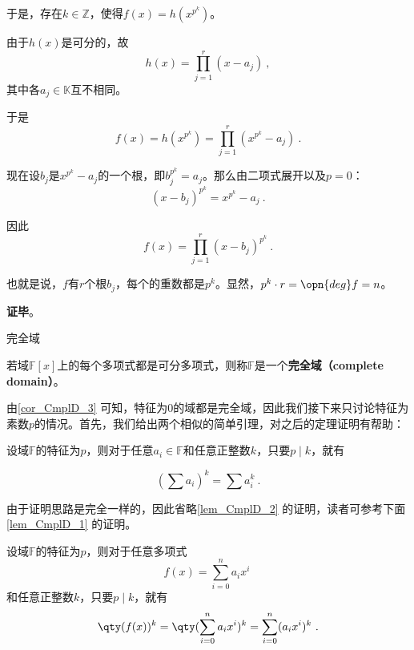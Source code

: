 于是，存在$k\in\mathbb{Z}$，使得$f(x) = h(x^{p^k})$。

由于$h(x)$是可分的，故
\begin{equation}
h(x) = \prod_{j=1}^{r}(x-a_j)~,
\end{equation}
其中各$a_j\in\mathbb{K}$互不相同。

于是
\begin{equation}
f(x) = h(x^{p^k}) = \prod_{j=1}^{r}(x^{p^k}-a_j)~.
\end{equation}

现在设$b_j$是$x^{p^k}-a_j$的一个根，即$b_j^{p^k}=a_j$。那么由二项式展开以及$p=0$：
\begin{equation}
(x-b_j)^{p^k} = x^{p^k}-a_j~.
\end{equation}

因此
\begin{equation}
f(x) = \prod_{j=1}^{r} (x-b_j)^{p^k}~.
\end{equation}

也就是说，$f$有$r$个根$b_j$，每个的重数都是$p^k$。显然，$p^k\cdot r = \opn{deg}f = n$。

\textbf{证毕}。


\begin{definition}{完全域}

若域$\mathbb{F}[x]$上的每个多项式都是可分多项式，则称$\mathbb{F}$是一个\textbf{完全域（complete domain）}。

\end{definition}

由\autoref{cor_CmplD_3} 可知，特征为$0$的域都是完全域，因此我们接下来只讨论特征为素数$p$的情况。首先，我们给出两个相似的简单引理，对之后的定理证明有帮助：


\begin{lemma}{}\label{lem_CmplD_2}
设域$\mathbb{F}$的特征为$p$，则对于任意$a_i\in\mathbb{F}$和任意正整数$k$，只要$p\mid k$，就有

\begin{equation}
(\sum a_i)^k = \sum a_i^k~.
\end{equation}

\end{lemma}

由于证明思路是完全一样的，因此省略\autoref{lem_CmplD_2} 的证明，读者可参考下面\autoref{lem_CmplD_1} 的证明。


\begin{lemma}{}\label{lem_CmplD_1}
设域$\mathbb{F}$的特征为$p$，则对于任意多项式
\begin{equation}
f(x) = \sum_{i=0}^n a_ix^i~
\end{equation}
和任意正整数$k$，只要$p\mid k$，就有
\begin{equation}
\qty(f(x))^k = \qty(\sum_{i=0}^n a_ix^i)^k = \sum_{i=0}^n (a_ix^i)^k~.
\end{equation}
\end{lemma}

